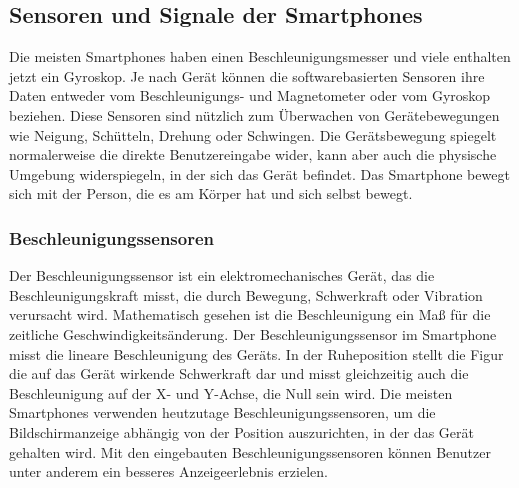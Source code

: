 \subsection{Sensoren und Signale der Smartphones}

%
%
%
%
%
Die meisten Smartphones haben einen Beschleunigungsmesser und viele enthalten jetzt ein Gyroskop. Je nach Gerät können die softwarebasierten Sensoren ihre Daten entweder vom Beschleunigungs- und Magnetometer oder vom Gyroskop beziehen. Diese Sensoren sind nützlich zum Überwachen von Gerätebewegungen wie Neigung, Schütteln, Drehung oder Schwingen. Die Gerätsbewegung spiegelt normalerweise die direkte Benutzereingabe wider, kann aber auch die physische Umgebung widerspiegeln, in der sich das Gerät befindet. Das Smartphone bewegt sich mit der Person, die es am Körper hat und sich selbst bewegt.\citep{DevelopersMotionSen}



%
%
%
%


\subsubsection{Beschleunigungssensoren}

Der Beschleunigungssensor ist ein elektromechanisches Gerät, das die Beschleunigungskraft misst, die durch Bewegung, Schwerkraft oder Vibration verursacht wird. Mathematisch gesehen ist die Beschleunigung ein Maß für die zeitliche Geschwindigkeitsänderung.
Der Beschleunigungssensor im Smartphone misst die lineare Beschleunigung des Geräts. In der Ruheposition stellt die Figur die auf das Gerät wirkende Schwerkraft dar und misst gleichzeitig auch die Beschleunigung auf der X- und Y-Achse, die Null sein wird.
Die meisten Smartphones verwenden heutzutage Beschleunigungssensoren, um die Bildschirmanzeige abhängig von der Position auszurichten, in der das Gerät gehalten wird. Mit den eingebauten Beschleunigungssensoren können Benutzer unter anderem ein besseres Anzeigeerlebnis erzielen. \citep{Sharma2020}

